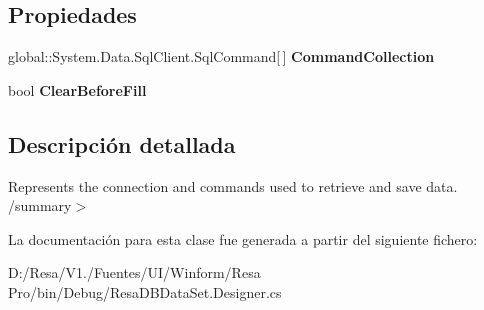 \subsection*{Propiedades}
\begin{DoxyCompactItemize}
\item 
global\+::\+System.\+Data.\+Sql\+Client.\+Sql\+Command[$\,$] {\bfseries Command\+Collection}\hspace{0.3cm}{\ttfamily  [get]}\label{class_resa___pro_1_1_resa_d_b_data_set_table_adapters_1_1_obtener_eventos_detallados_x_i_d_table_adapter_a5191a84ea3c3324a7d2b7755573adc8d}

\item 
bool {\bfseries Clear\+Before\+Fill}\hspace{0.3cm}{\ttfamily  [get, set]}\label{class_resa___pro_1_1_resa_d_b_data_set_table_adapters_1_1_obtener_eventos_detallados_x_i_d_table_adapter_adfb1e4c2412aa90139f5e4e8ca352514}

\end{DoxyCompactItemize}


\subsection{Descripción detallada}
Represents the connection and commands used to retrieve and save data. /summary$>$ 

La documentación para esta clase fue generada a partir del siguiente fichero\+:\begin{DoxyCompactItemize}
\item 
D\+:/\+Resa/\+V1./\+Fuentes/\+U\+I/\+Winform/\+Resa Pro/bin/\+Debug/Resa\+D\+B\+Data\+Set.\+Designer.\+cs\end{DoxyCompactItemize}
